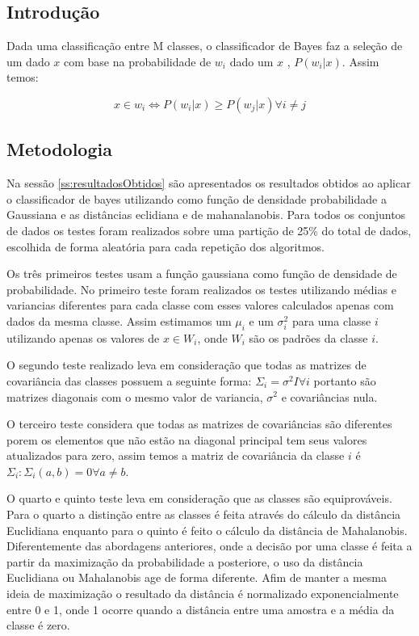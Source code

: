 \documentclass[ 
	article,			%
	11pt,				%
	oneside,			%
	a4paper,			%
	english,			%
	brazil,				%
	]{abntex2}
\begin{document}
\subsection{Introdução}
Dada uma classificação entre M classes, o classificador de Bayes faz a seleção
de um dado $x$ com base na probabilidade de $w_i$ dado um $x$ , $P(w_i|x)$.
Assim temos:


\begin{equation}
	x \in w_i \iff P(w_i|x) \geq P(w_j|x) \forall i \neq j
\end{equation}

\subsection{Metodologia}
\label{ss:metAplbayes}
Na sessão \ref{ss:resultadosObtidos} são apresentados os resultados obtidos ao
aplicar o classificador de bayes utilizando como função de densidade
probabilidade a Gaussiana e as distâncias eclidiana e de mahanalanobis. Para
todos os conjuntos de dados os testes foram realizados sobre uma partição de 25\% do total de dados, escolhida de forma
aleatória para cada repetição dos algoritmos.

Os três primeiros testes usam a função gaussiana como função de
densidade de probabilidade. No primeiro teste foram realizados os testes
utilizando médias e variancias diferentes para cada classe com esses valores
calculados apenas com dados da mesma classe. Assim estimamos um $\mu_i$ e um
$\sigma^2_i$ para uma classe $i$ utilizando apenas os valores de $x \in W_i$, onde $W_i$ são os padrões da classe $i$.

O segundo teste realizado leva em consideração que todas as matrizes de
covariância das classes possuem a seguinte forma: $\Sigma_i=\sigma^2I \forall i$
portanto são matrizes diagonais com o mesmo valor de variancia, $\sigma^2$ e
covariâncias nula.

O terceiro teste considera que todas as matrizes de covariâncias são diferentes
porem os elementos que não estão na diagonal principal tem seus valores
atualizados para zero, assim temos a matriz de covariância da classe
$i$ é $\Sigma_i : \Sigma_i(a,b)=0 \forall a \neq b$.

O quarto e quinto teste leva em consideração que as classes são equiprováveis.
Para o quarto a distinção entre as classes é feita através do cálculo da
distância Euclidiana enquanto para o quinto é feito o cálculo da distância de
Mahalanobis. Diferentemente das abordagens anteriores, onde a decisão por uma
classe é feita a partir da maximização da probabilidade a posteriore, o uso da
distância Euclidiana ou Mahalanobis age de forma diferente. Afim de manter a
mesma ideia de maximização o resultado da distância é normalizado
exponencialmente entre 0 e 1, onde 1 ocorre quando a distância entre uma amostra
e a média da classe é zero.
\end{document}

